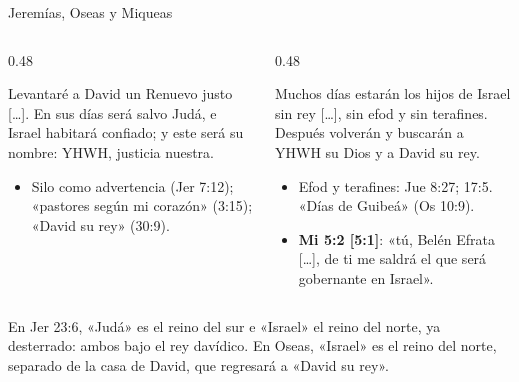 \begin{frame}{Jeremías, Oseas y Miqueas}
\begin{columns}[T,onlytextwidth]
\begin{column}{0.48\textwidth}
\begin{cita}[fontupper=\scriptsize\itshape]Levantaré a David un Renuevo justo [\ldots]. En sus días será salvo Judá, e Israel habitará confiado; y este será su nombre: YHWH, justicia nuestra.\end{cita}
\scriptsize
\begin{itemize}
\item Silo como advertencia (Jer 7:12); «pastores según mi corazón» (3:15); «David su rey» (30:9).
\end{itemize}
\end{column}
\begin{column}{0.48\textwidth}
\begin{cita}[fontupper=\scriptsize\itshape]Muchos días estarán los hijos de Israel sin rey [\ldots], sin efod y sin terafines. Después volverán y buscarán a YHWH su Dios y a David su rey.\end{cita}
\scriptsize
\begin{itemize}
\item Efod y terafines: Jue 8:27; 17:5. «Días de Guibeá» (Os 10:9).
\item \textbf{Mi 5:2 [5:1]}: «tú, Belén Efrata [\ldots], de ti me saldrá el que será gobernante en Israel».
\end{itemize}
\end{column}
\end{columns}
\vspace{2pt}
\begin{notalam}
En Jer 23:6, «Judá» es el reino del sur e «Israel» el reino del norte, ya desterrado: ambos bajo el rey davídico. En Oseas, «Israel» es el reino del norte, separado de la casa de David, que regresará a «David su rey».
\end{notalam}
\end{frame}

